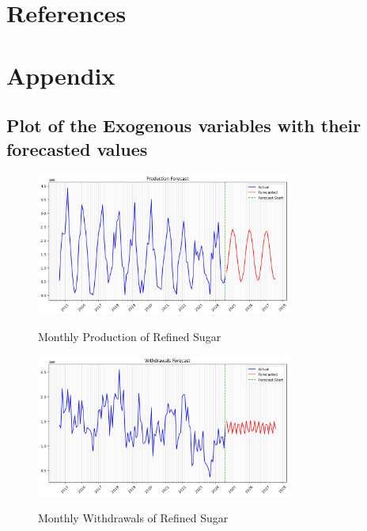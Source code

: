 \documentclass[11pt]{article}
\begin{document}
\newpage
\section{References}
\renewcommand{\refname}{\vspace*{-2em}} 



\newpage
\section{Appendix}


\renewcommand{\thesubsection}{A.\arabic{subsection}}

\subsection{Plot of the Exogenous variables with their forecasted values}
\label{exog_plot}

    \begin{figure}[H]
        \caption*{Monthly Production of Refined Sugar}
        \centering
        \includegraphics[width=0.75\textwidth]{production_plot.png}
        \label{production_plot}
    \end{figure}

    \begin{figure}[H]
        \caption*{Monthly Withdrawals of Refined Sugar }
        \centering
        \includegraphics[width=0.75\textwidth]{withdrawals_plot.png}
        \label{withdrawals_plot}
    \end{figure}
\end{document}
